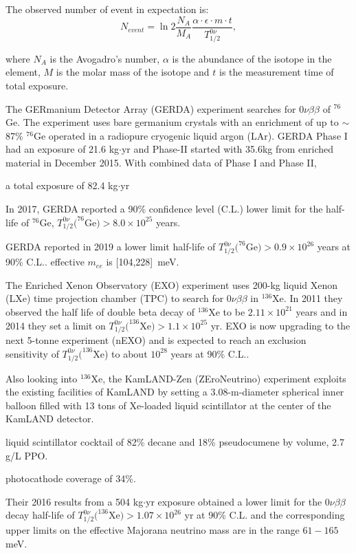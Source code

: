 The observed number of event in expectation is: 
\[
N_{event} = \ln 2 \frac{N_A}{M_A}\frac{\alpha\cdot\epsilon\cdot m\cdot t}{T^{0\nu}_{1/2}},
\]

where $N_A$ is the Avogadro's number, $\alpha$ is the abundance of the isotope in the element, 
$M$ is the molar mass of the isotope
and $t$ is the measurement time of total exposure.



The GERmanium Detector Array (GERDA) experiment searches for $0\nu\beta\beta$ of $^{76}$Ge. The experiment uses bare germanium crystals with an enrichment of up to $\sim$87\% $^{76}$Ge operated in a radiopure cryogenic liquid argon (LAr)\cite{agostini2016search}. GERDA Phase I had an exposure of 21.6 kg$\cdot$yr and Phase-II started with 35.6kg from enriched material in December 2015. With combined data of Phase I and Phase II, 

a total exposure of 82.4 kg$\cdot$yr 

In 2017, GERDA reported a 90\% confidence level (C.L.) lower limit for the half-life of $^{76}$Ge, $T^{0\nu}_{1/2}(^{76}$Ge$)>8.0\times 10^{25}$ years.

GERDA reported in 2019 a lower limit half-life of $T^{0\nu}_{1/2}(^{76}$Ge$)>0.9\times 10^{26}$ years at 90\% C.L.\cite{agostini2019probing}. effective $m_{ee}$ is [104,228]~meV.


The Enriched Xenon Observatory (EXO) experiment uses 200-kg liquid Xenon (LXe) time projection chamber (TPC) to search for $0\nu\beta\beta$ in $^{136}$Xe. In 2011 they observed the half life of double beta decay of $^{136}$Xe to be $2.11\times 10^{21}$ years and in 2014 they set a limit on $T^{0\nu}_{1/2}(^{136}$Xe$)>1.1\times 10^{25}$ yr\cite{albert2014search}. EXO is now upgrading to the next 5-tonne experiment (nEXO) and is expected to reach an exclusion sensitivity of $T^{0\nu}_{1/2}(^{136}$Xe) to about $10^{28}$ years at 90\% C.L.\cite{albert2018sensitivity}.

Also looking into $^{136}$Xe, the KamLAND-Zen (ZEroNeutrino) experiment exploits the existing facilities of KamLAND by setting a 3.08-m-diameter spherical inner balloon filled with 13 tons of Xe-loaded liquid scintillator at the center of the KamLAND detector.

liquid scintillator cocktail of 82\% decane and 18\% pseudocumene by volume, 2.7 g/L PPO.

photocathode coverage of 34\%.

Their 2016 results from a 504 kg$\cdot$yr exposure obtained a lower limit for the $0\nu\beta\beta$ decay half-life of $T^{0\nu}_{1/2}(^{136}$Xe$)>1.07\times 10^{26}$ yr at 90\% C.L. and the corresponding upper limits on the effective Majorana neutrino mass are in the range $61-165$ meV\cite{gando2016search}.

